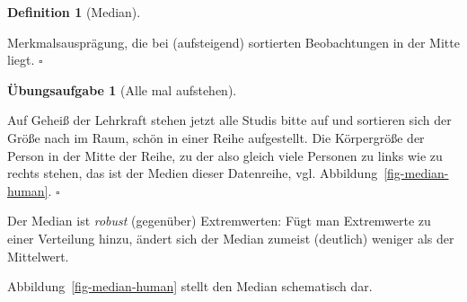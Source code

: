 \documentclass[
  letterpaper,
]{scrbook}
\theoremstyle{definition}
\theoremstyle{definition}
\newtheorem{definition}{Definition}[chapter]
\theoremstyle{definition}
\newtheorem{exercise}{Übungsaufgabe}[chapter]
\theoremstyle{remark}
\begin{document}
\begin{definition}[Median]\protect\hypertarget{def-median}{}\label{def-median}

Merkmalsausprägung, die bei (aufsteigend) sortierten Beobachtungen in
der Mitte liegt. \(\square\)

\end{definition}

\begin{exercise}[Alle mal
aufstehen]\protect\hypertarget{exr-aufstellen}{}\label{exr-aufstellen}

Auf Geheiß der Lehrkraft stehen jetzt alle Studis bitte auf und
sortieren sich der Größe nach im Raum, schön in einer Reihe aufgestellt.
Die Körpergröße der Person in der Mitte der Reihe, zu der also gleich
viele Personen zu links wie zu rechts stehen, das ist der Medien dieser
Datenreihe, vgl. Abbildung~\ref{fig-median-human}. \(\square\)

\end{exercise}

Der Median ist \emph{robust} (gegenüber) Extremwerten: Fügt man
Extremwerte zu einer Verteilung hinzu, ändert sich der Median zumeist
(deutlich) weniger als der Mittelwert.

Abbildung~\ref{fig-median-human} stellt den Median schematisch dar.
\end{document}
